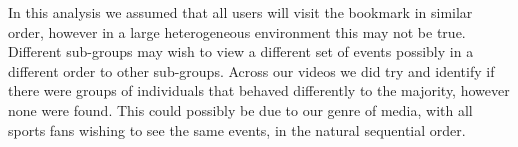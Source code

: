 In this analysis we assumed that all users will visit the bookmark in similar order, however in a large heterogeneous environment this may not be true. Different sub-groups may wish to view a different set of events possibly in a different order to other sub-groups. Across our videos we did try and identify if there were groups of individuals that behaved differently to the majority, however none were found. This could possibly be due to our genre of media, with all sports fans wishing to see the same events, in the natural sequential order.




